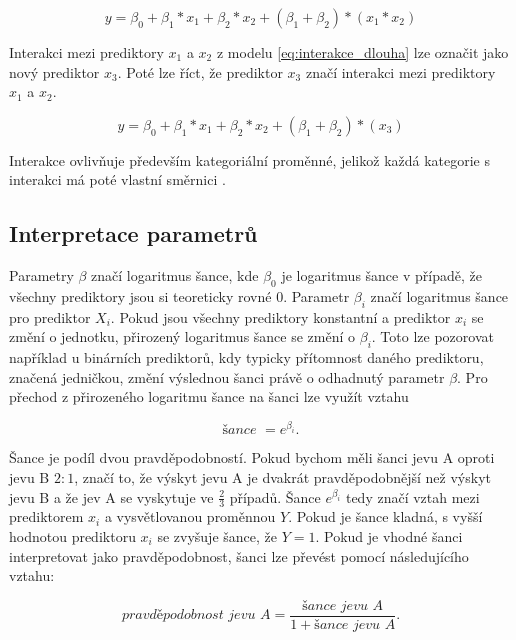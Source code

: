 \begin{equation}
    \label{eq:interakce_dlouha}
    y = \beta_0 + \beta_1*x_1 + \beta_2*x_2 + (\beta_1 + \beta_2)*(x_1*x_2)
\end{equation}

Interakci mezi prediktory $x_1$ a $x_2$ z modelu \ref{eq:interakce_dlouha} lze označit jako nový prediktor $x_3$. Poté lze říct, že prediktor $x_3$ značí interakci mezi prediktory
$x_1$ a $x_2$.

\begin{equation}
    \label{eq:interakce}
    y = \beta_0 + \beta_1*x_1 + \beta_2*x_2 + (\beta_1 + \beta_2)*(x_3)
\end{equation}

Interakce ovlivňuje především kategoriální proměnné, jelikož každá kategorie s interakci má poté vlastní směrnici \cite{hindls_statistika_2018}.

\subsection{Interpretace parametrů}
Parametry $\beta$ značí logaritmus šance, kde $\beta_0$ je logaritmus šance v případě, že všechny prediktory jsou si teoreticky rovné $0$. Parametr $\beta_i$ značí logaritmus
šance pro prediktor $X_i$. Pokud jsou všechny prediktory konstantní a prediktor $x_i$ se změní o jednotku, přirozený logaritmus šance se změní o $\beta_i$. Toto lze pozorovat
například u binárních prediktorů, kdy typicky přítomnost daného prediktoru, značená jedničkou, změní výslednou šanci právě o odhadnutý parametr $\beta$. Pro přechod z přirozeného
logaritmu šance na šanci lze využít vztahu

\begin{equation}
\textit{šance } = e^{\beta_i}.
\end{equation}

Šance je podíl dvou pravděpodobností. Pokud bychom měli šanci jevu A oproti jevu B $2 : 1$, značí to, že výskyt jevu A je dvakrát pravděpodobnější než
výskyt jevu B a že jev A se vyskytuje ve $\frac{2}{3}$ případů. Šance $e^{\beta_i}$ tedy značí vztah mezi prediktorem $x_i$ a vysvětlovanou proměnnou $Y$. Pokud je
šance kladná, s vyšší hodnotou prediktoru $x_i$ se zvyšuje šance, že $Y = 1$. Pokud je vhodné šanci interpretovat jako pravděpodobnost, šanci lze převést pomocí
následujícího vztahu:

\begin{equation}
    \textit{pravděpodobnost jevu A} = \frac{\textit{šance jevu A}}{1 + \textit{šance jevu A}}.
\end{equation}

